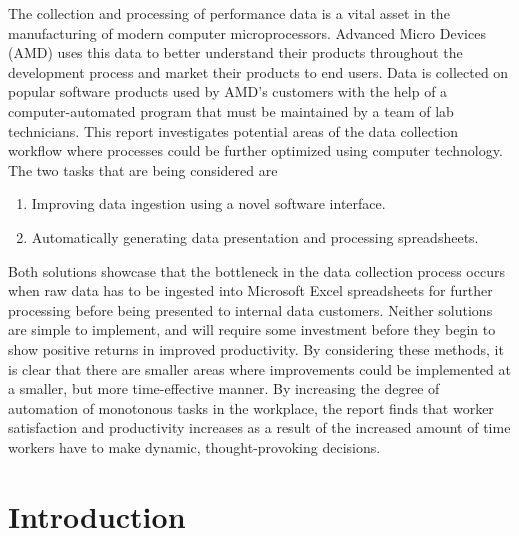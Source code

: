 \documentclass[12pt]{article}
\begin{document}


\indent\hspace{0.5in} The collection and processing of performance data is a vital asset in the manufacturing of modern computer microprocessors. Advanced Micro Devices (AMD) uses this data to better understand their products throughout the development process and market their products to end users. Data is collected on popular software products used by AMD's customers with the help of a computer-automated program that must be maintained by a team of lab technicians. This report investigates potential areas of the data collection workflow where processes could be further optimized using computer technology. The two tasks that are being considered are

\begin{enumerate}
\item Improving data ingestion using a novel software interface.
\item Automatically generating data presentation and processing spreadsheets.
\end{enumerate}

\indent\hspace{0.5in} Both solutions showcase that the bottleneck in the data collection process occurs when raw data has to be ingested into Microsoft Excel spreadsheets for further processing before being presented to internal data customers. Neither solutions are simple to implement, and will require some investment before they begin to show positive returns in improved productivity. By considering these methods, it is clear that there are smaller areas where improvements could be implemented at a smaller, but more time-effective manner. By increasing the degree of automation of monotonous tasks in the workplace, the report finds that worker satisfaction and productivity increases as a result of the increased amount of time workers have to make dynamic, thought-provoking decisions.


\formattingForRestOfReport
\section{Introduction}
\end{document}
